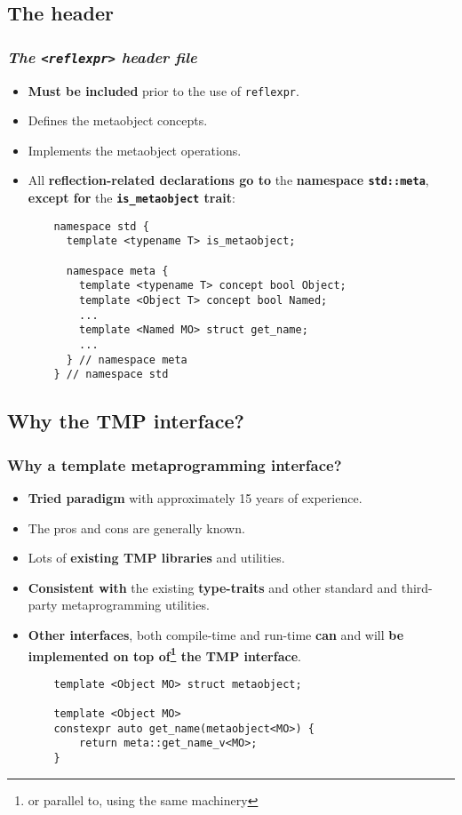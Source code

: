 \documentclass[compress,table,xcolor=table]{beamer}
\begin{document}
\subsection{The header}
\begin{frame}[fragile]
\frametitle{\em The \texttt{<reflexpr>} header file}
  \begin{itemize}
    \item \textbf{Must be included} prior to the use of \texttt{reflexpr}.
    \item Defines the metaobject concepts.
    \item Implements the metaobject operations.
    \item All \textbf{reflection-related declarations go to} the \textbf{namespace
    \texttt{std::meta}}, \textbf{except for} the \textbf{\texttt{is\_metaobject} trait}:
    \begin{lstlisting}
	namespace std {
	  template <typename T> is_metaobject;

	  namespace meta {
	    template <typename T> concept bool Object;
	    template <Object T> concept bool Named;
	    ...
	    template <Named MO> struct get_name;
	    ...
	  } // namespace meta
	} // namespace std
    \end{lstlisting}
  \end{itemize}
\end{frame}

\subsection{Why the TMP interface?}
\begin{frame}[fragile]
\frametitle{Why a template metaprogramming interface?}
  \large
  \begin{itemize}
    \item \textbf{Tried paradigm} with approximately 15 years of experience.
    \item The pros and cons are generally known.
    \item Lots of \textbf{existing TMP libraries} and utilities.
    \item \textbf{Consistent with} the existing \textbf{type-traits} and other
      standard and third-party metaprogramming utilities.
    \item \textbf{Other interfaces}, both compile-time and run-time \textbf{can}
      and will \textbf{be implemented on top of\footnote{or parallel to, using
      the same machinery} the TMP interface}.
    \begin{lstlisting}
	template <Object MO> struct metaobject;

	template <Object MO>
	constexpr auto get_name(metaobject<MO>) {
	    return meta::get_name_v<MO>;
	}
    \end{lstlisting}
  \end{itemize}
\end{frame}
\end{document}
